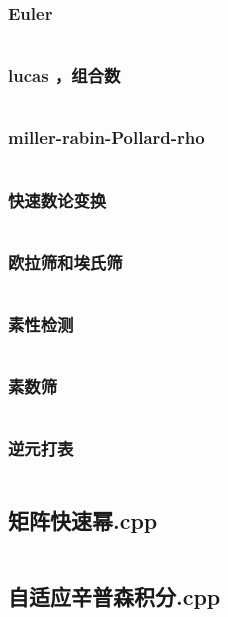 \documentclass{article}
\begin{document}
\subsubsection{Euler}
\inputminted{c++}{/home/zzuzxy/t3/ACM-template/4 数学/数论/Euler.cpp}
\subsubsection{lucas ，组合数}
\inputminted{c++}{/home/zzuzxy/t3/ACM-template/4 数学/数论/lucas ，组合数.cpp}
\subsubsection{miller-rabin-Pollard-rho}
\inputminted{c++}{/home/zzuzxy/t3/ACM-template/4 数学/数论/miller-rabin-Pollard-rho.cpp}
\subsubsection{快速数论变换}
\inputminted{c++}{/home/zzuzxy/t3/ACM-template/4 数学/数论/快速数论变换.cpp}
\subsubsection{欧拉筛和埃氏筛}
\inputminted{c++}{/home/zzuzxy/t3/ACM-template/4 数学/数论/欧拉筛和埃氏筛.cpp}
\subsubsection{素性检测}
\inputminted{c++}{/home/zzuzxy/t3/ACM-template/4 数学/数论/素性检测.cpp}
\subsubsection{素数筛}
\inputminted{c++}{/home/zzuzxy/t3/ACM-template/4 数学/数论/素数筛.cpp}
\subsubsection{逆元打表}
\inputminted{c++}{/home/zzuzxy/t3/ACM-template/4 数学/数论/逆元打表.cpp}
\subsection{矩阵快速幂.cpp}
\inputminted{c++}{/home/zzuzxy/t3/ACM-template/4 数学/矩阵快速幂.cpp}
\subsection{自适应辛普森积分.cpp}
\inputminted{c++}{/home/zzuzxy/t3/ACM-template/4 数学/自适应辛普森积分.cpp}
\end{document}
